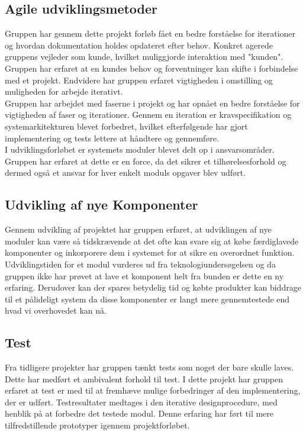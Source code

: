 \subsection{Agile udviklingsmetoder}
Gruppen har gennem dette projekt forløb fået en bedre forståelse for iterationer og hvordan dokumentation holdes opdateret efter behov. Konkret agerede gruppens vejleder som kunde, hvilket muliggjorde interaktion med "kunden". Gruppen har erfaret at en kundes behov og forventninger kan skifte i forbindelse med et projekt. Endvidere har gruppen erfaret vigtigheden i omstilling og muligheden for arbejde iterativt.\\
Gruppen har arbejdet med faserne i projekt og har opnået en bedre forståelse for vigtigheden af faser og iterationer. Gennem en iteration er kravspecifikation og systemarkitekturen blevet forbedret, hvilket efterfølgende har gjort implementering og tests lettere at håndtere og gennemføre.\\
I udviklingsforløbet er systemets moduler blevet delt op i ansvarsområder. Gruppen har erfaret at dette er en force, da det sikrer et tilhørelsesforhold og dermed også et ansvar for hver enkelt moduls opgaver blev udført.

\subsection{Udvikling af nye Komponenter}
Gennem udvikling af projektet har gruppen erfaret, at udviklingen af nye moduler kan være så tidskrævende at det ofte kan svare sig at købe færdiglavede komponenter og inkorporere dem i systemet for at sikre en overordnet funktion. Udviklingstiden for et modul vurderes ud fra teknologiundersøgelsen og da gruppen ikke har prøvet at lave et komponent helt fra bunden er dette en ny erfaring. Derudover kan der spares betydelig tid og købte produkter kan biddrage til et pålideligt system da disse komponenter er langt mere gennemtestede end hvad vi overhovedet kan nå.

\subsection{Test}
Fra tidligere projekter har gruppen tænkt tests som noget der bare skulle laves. Dette har medført et ambivalent forhold til test. I dette projekt har gruppen erfaret at test er med til at fremhæve mulige forbedringer af den implementering, der er udført. Testresultater medtages i den iterative designprocedure, med henblik på at forbedre det testede modul. Denne erfaring har ført til mere tilfredstillende prototyper igennem projektforløbet.


